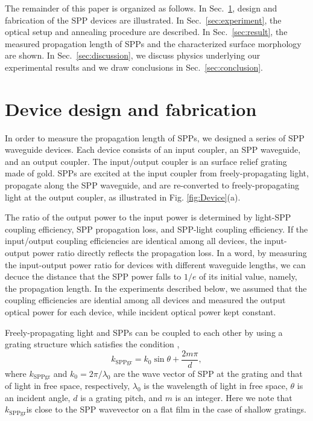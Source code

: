 \documentclass[twocolumn,10.5pt,a4]{article}
\begin{document}
The remainder of this paper is organized as follows.
In Sec.~\ref{sec:device}, design and fabrication of the SPP devices are illustrated.
In Sec.~\ref{sec:experiment}, the optical setup and annealing procedure are described.
In Sec.~\ref{sec:result}, the measured propagation length of SPPs and the characterized surface morphology are shown.
In Sec.~\ref{sec:discussion}, we discuss physics underlying our experimental results and we draw conclusions in Sec.~\ref{sec:conclusion}.

\cite{Kusa2014}
\cite{Olmon}
\fi

\section{Device design and fabrication}
\label{sec:device}
In order to measure the propagation length of SPPs, we designed a series of SPP waveguide devices. Each device consists of an input coupler, an SPP waveguide, and an output coupler.  The input/output coupler is an surface relief grating made of gold. SPPs are  excited at the input coupler from freely-propagating light, propagate along the SPP waveguide, and are re-converted to freely-propagating light at the output coupler, as illustrated in Fig. \ref{fig:Device}(a). 

The ratio of the output power to the input power is determined by light-SPP coupling efficiency, SPP propagation loss, and SPP-light coupling efficiency. If the input/output coupling efficiencies are identical among all devices,  the input-output power ratio directly reflects the propagation loss. In a word, by measuring the input-output power ratio for devices with different waveguide lengths, we can decuce the distance that the SPP power falls to $1/e$ of its initial value, namely, the propagation length. In the experiments described below, we assumed that the coupling efficiencies are idential among all devices and measured the output optical power for each device, while incident optical power kept constant. 

Freely-propagating light and SPPs can be coupled to each other by using a grating structure which satisfies the condition \cite{Koev},
\begin{equation}
k_{\mathrm{SPPgr}}=k_0 \sin \theta + \frac{2m\pi}{d},
\label{eq:phase-match}
\end{equation}
where $k_{\mathrm{SPPgr}}$ and $k_0=2\pi/\lambda_0$ are the wave vector of SPP at the grating and that of light in free space, respectively, $\lambda_0$ is the wavelength of light in free space, $\theta$ is an incident angle, $d$ is a grating pitch, and $m$ is an integer. Here we note that $k_{\mathrm{SPPgr}}$is close to the SPP wavevector on a flat film in the case of shallow gratings.
\end{document}
